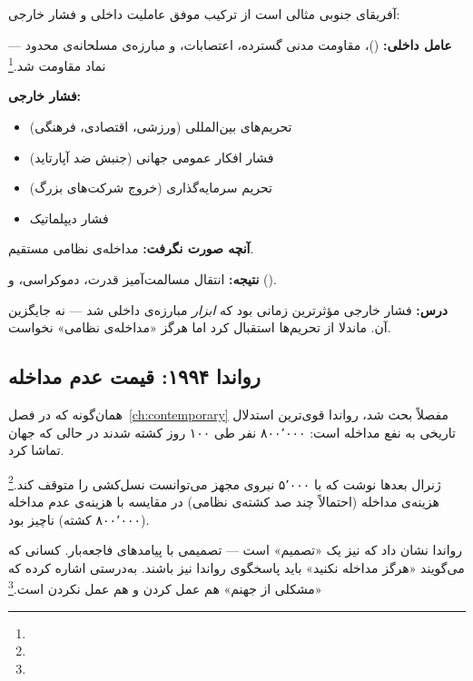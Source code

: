 \begin{tcolorbox}[casebox, title={مطالعه‌ی موردی: پایان آپارتاید در آفریقای جنوبی (۱۹۹۴)}]
آفریقای جنوبی مثالی است از ترکیب موفق عاملیت داخلی و فشار خارجی:

\textbf{عامل داخلی:}  ()، مقاومت مدنی گسترده، اعتصابات، و مبارزه‌ی مسلحانه‌ی محدود —  نماد مقاومت شد.\footnote{}

\textbf{فشار خارجی:}
\begin{itemize}
\item تحریم‌های بین‌المللی (ورزشی، اقتصادی، فرهنگی)
\item فشار افکار عمومی جهانی (جنبش ضد آپارتاید)
\item تحریم سرمایه‌گذاری (خروج شرکت‌های بزرگ)
\item فشار دیپلماتیک
\end{itemize}

\textbf{آنچه صورت نگرفت:} مداخله‌ی نظامی مستقیم.

\textbf{نتیجه:} انتقال مسالمت‌آمیز قدرت، دموکراسی، و  ().

\textbf{درس:} فشار خارجی مؤثرترین زمانی بود که \textit{ابزار} مبارزه‌ی داخلی شد — نه جایگزین آن. ماندلا از تحریم‌ها استقبال کرد اما هرگز «مداخله‌ی نظامی» نخواست.
\end{tcolorbox}

\subsection{رواندا ۱۹۹۴: قیمت عدم مداخله}
\label{subsec:ch15-rwanda}

همان‌گونه که در فصل~\ref{ch:contemporary} مفصلاً بحث شد، رواندا قوی‌ترین استدلال تاریخی به نفع مداخله است: ۸۰۰٬۰۰۰ نفر طی ۱۰۰ روز کشته شدند در حالی که جهان تماشا کرد.

ژنرال  بعدها نوشت که با ۵٬۰۰۰ نیروی مجهز می‌توانست نسل‌کشی را متوقف کند.\footnote{} هزینه‌ی مداخله (احتمالاً چند صد کشته‌ی نظامی) در مقایسه با هزینه‌ی عدم مداخله (۸۰۰٬۰۰۰ کشته) ناچیز بود.

\begin{tcolorbox}[enemybox, title={رواندا: وقتی عدم مداخله جنایت است}]
رواندا نشان داد که  نیز یک «تصمیم» است — تصمیمی با پیامدهای فاجعه‌بار. کسانی که می‌گویند «هرگز مداخله نکنید» باید پاسخگوی رواندا نیز باشند.  به‌درستی اشاره کرده که «مشکلی از جهنم» هم عمل کردن و هم عمل نکردن است.\footnote{}
\end{tcolorbox}


